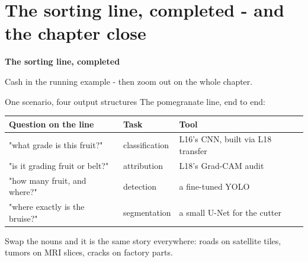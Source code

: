 \documentclass[aspectratio=169]{beamer}
\begin{document}
\section{The sorting line, completed - and the chapter close}

\begin{frame}[plain]
  \vfill
  \begin{center}
    {\Large\color{popblue}\textbf{The sorting line, completed}}\\[0.9em]
    \begin{minipage}{0.82\textwidth}\centering\small
      Cash in the running example - then zoom out on the whole chapter.
    \end{minipage}
  \end{center}
  \vfill
\end{frame}

\begin{frame}{One scenario, four output structures}
  The pomegranate line, end to end:
  \vskip 4pt
  \begin{center}\small
    \begin{tabular}{l l l}
      \textbf{Question on the line} & \textbf{Task} & \textbf{Tool}\\
      \hline
      "what grade is this fruit?" & classification & L16's CNN, built via L18 transfer\\
      "is it grading fruit or belt?" & attribution & L18's Grad-CAM audit\\
      "how many fruit, and where?" & detection & a fine-tuned YOLO\\
      "where exactly is the bruise?" & segmentation & a small U-Net for the cutter\\
    \end{tabular}
  \end{center}
  \vskip 6pt
  Swap the nouns and it is the same story everywhere: roads on satellite tiles, tumors
  on MRI slices, cracks on factory parts.
  \vskip 4pt
\end{frame}
\end{document}
